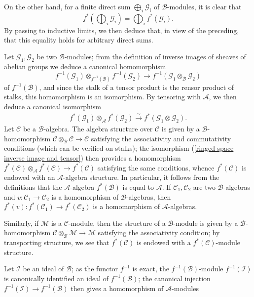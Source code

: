 On the other hand, for a finite direct sum $\bigoplus_i\mathscr{G}_i$ of $\mathscr{B}$-modules, it is clear that
\[f^*(\bigoplus_i\mathscr{G}_i)=\bigoplus_if^*(\mathscr{G}_i).\]
By passing to inductive limits, we then deduce that, in view of the preceding, that this equality holds for arbitrary direct sums.\par
Let $\mathscr{G}_1,\mathscr{G}_2$ be two $\mathscr{B}$-modules; from the definition of inverse images of sheaves of abelian groups we deduce a canonical homomorphism
\[f^{-1}(\mathscr{G}_1)\otimes_{f^{-1}(\mathscr{B})}f^{-1}(\mathscr{G}_2)\to f^{-1}(\mathscr{G}_1\otimes_{\mathscr{B}}\mathscr{G}_2)\]
of $f^{-1}(\mathscr{B})$, and since the stalk of a tensor product is the rensor product of stalks, this homomorphism is an isomorphism. By tensoring with $\mathscr{A}$, we then deduce a canonical isomorphism 
\begin{align}\label{ringed space inverse image and tensor}
f^*(\mathscr{G}_1)\otimes_{\mathscr{A}}f^*(\mathscr{G}_2)\stackrel{\sim}{\to}f^*(\mathscr{G}_1\otimes\mathscr{G}_2).
\end{align}
Let $\mathscr{C}$ be a $\mathscr{B}$-algebra. The algebra structure over $\mathscr{C}$ is given by a $\mathscr{B}$-homomorphism $\mathscr{C}\otimes_{\mathscr{B}}\mathscr{C}\to\mathscr{C}$ satisfying the associativity and commutativity conditions (which can be verified on stalks); the isomorphism (\ref{ringed space inverse image and tensor}) then provides a homomorphism $f^*(\mathscr{C})\otimes_{\mathscr{A}}f^*(\mathscr{C})\to f^*(\mathscr{C})$ satisfying the same conditions, whence $f^*(\mathscr{C})$ is endowed with an $\mathscr{A}$-algebra structure. In particular, it follows from the definitions that the $\mathscr{A}$-algebra $f^*(\mathscr{B})$ is equal to $\mathscr{A}$. If $\mathscr{C}_1,\mathscr{C}_2$ are two $\mathscr{B}$-algebras and $v:\mathscr{C}_1\to\mathscr{C}_2$ is a homomorphism of $\mathscr{B}$-algebras, then $f^*(v):f^*(\mathscr{C}_1)\to f^*(\mathscr{C}_2)$ is a homomorphism of $\mathscr{A}$-algebras.\par
Similarly, if $\mathscr{M}$ is a $\mathscr{C}$-module, then the structure of a $\mathscr{B}$-module is given by a $\mathscr{B}$-homomorphism $\mathscr{C}\otimes_{\mathscr{B}}\mathscr{M}\to\mathscr{M}$ satisfying the associativity condition; by transporting structure, we see that $f^*(\mathscr{C})$ is endowed with a $f^*(\mathscr{C})$-module structure.\par
Let $\mathscr{I}$ be an ideal of $\mathscr{B}$; as the functor $f^{-1}$ is exact, the $f^{-1}(\mathscr{B})$-module $f^{-1}(\mathscr{I})$ is canonically identified an ideal of $f^{-1}(\mathscr{B})$; the canonical injection $f^{-1}(\mathscr{I})\to f^{-1}(\mathscr{B})$ then gives a homomorphism of $\mathscr{A}$-modules
